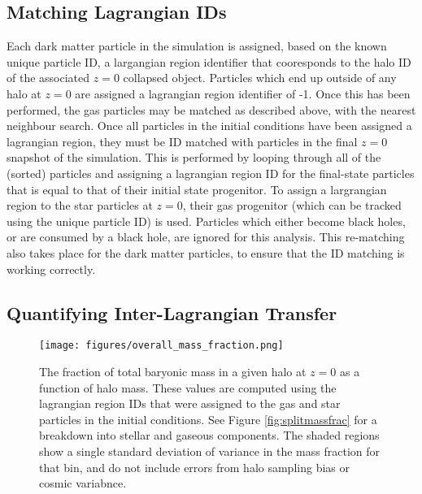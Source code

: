\subsection{Matching Lagrangian IDs}

Each dark matter particle in the simulation is assigned, based on the known unique particle ID, a largangian region identifier that cooresponds to the halo ID of the associated $z=0$ collapsed object. Particles which end up outside of any halo at $z=0$ are assigned a lagrangian region identifier of -1. Once this has been performed, the gas particles may be matched as described above, with the nearest neighbour search. Once all particles in the initial conditions have been assigned a lagrangian region, they must be ID matched with particles in the final $z=0$ snapshot of the simulation. This is performed by looping through all of the (sorted) particles and assigning a lagrangian region ID for the final-state particles that is equal to that of their initial state progenitor. To assign a largrangian region to the star particles at $z=0$, their gas progenitor (which can be tracked using the unique particle ID) is used. Particles which either become black holes, or are consumed by a black hole, are ignored for this analysis. This re-matching also takes place for the dark matter particles, to ensure that the ID matching is working correctly.


\subsection{Quantifying Inter-Lagrangian Transfer}

\begin{figure}
    \centering
    \texttt{[image: figures/overall\_mass\_fraction.png]}
    \caption{The fraction of total baryonic mass in a given halo at $z=0$ as a function of halo mass. These values are computed using the lagrangian region IDs that were assigned to the gas and star particles in the initial conditions. See Figure \ref{fig:splitmassfrac} for a breakdown into stellar and gaseous components. The shaded regions show a single standard deviation of variance in the mass fraction for that bin, and do not include errors from halo sampling bias or cosmic variabnce. }
    \label{fig:massfrac}
\end{figure}

